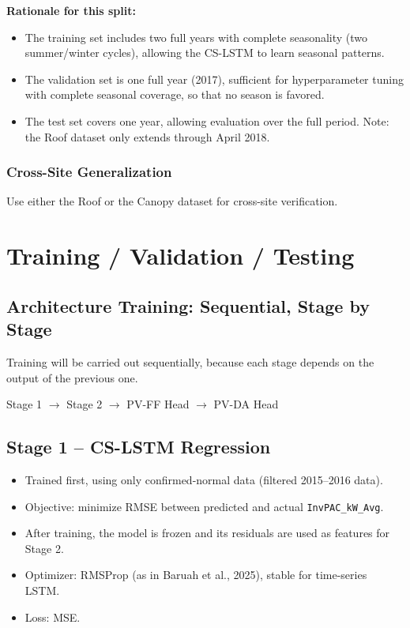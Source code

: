 \documentclass[11pt,a4paper]{article}
\begin{document}
\noindent\textbf{Rationale for this split:}
\begin{itemize}
    \item The training set includes two full years with complete seasonality (two summer/winter cycles), allowing the CS-LSTM to learn seasonal patterns.
    \item The validation set is one full year (2017), sufficient for hyperparameter tuning with complete seasonal coverage, so that no season is favored.
    \item The test set covers one year, allowing evaluation over the full period. Note: the Roof dataset only extends through April 2018.
\end{itemize}

\subsubsection*{Cross-Site Generalization}
Use either the Roof or the Canopy dataset for cross-site verification.

\section{Training / Validation / Testing}

\subsection*{Architecture Training: Sequential, Stage by Stage}
Training will be carried out sequentially, because each stage depends on the output of the previous one.

\begin{center}
Stage 1 $\rightarrow$ Stage 2 $\rightarrow$ PV-FF Head $\rightarrow$ PV-DA Head
\end{center}

\subsection*{Stage 1 -- CS-LSTM Regression}
\begin{itemize}
    \item Trained first, using only confirmed-normal data (filtered 2015--2016 data).
    \item Objective: minimize RMSE between predicted and actual \texttt{InvPAC\_kW\_Avg}.
    \item After training, the model is frozen and its residuals are used as features for Stage 2.
    \item Optimizer: RMSProp (as in Baruah et al., 2025), stable for time-series LSTM.
    \item Loss: MSE.
\end{itemize}
\end{document}
